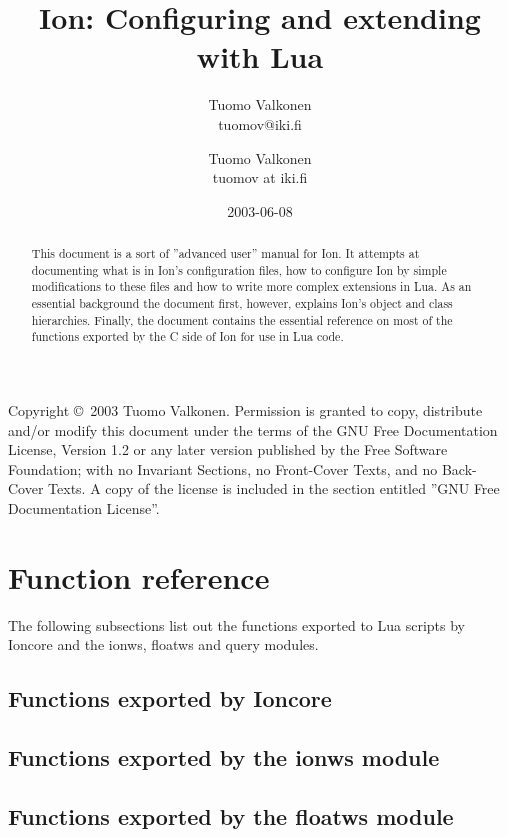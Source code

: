 \documentclass[english,a4paper,11pt,oldtoc,mctitle]{rapport3}
\title{Ion: Configuring and extending with Lua}
\author{Tuomo Valkonen \\ tuomov@iki.fi}
\author{Tuomo Valkonen \\ tuomov at iki.fi}
\date{2003-06-08}
\begin{document}
\maketitle

Copyright \copyright\  2003 Tuomo Valkonen.
Permission is granted to copy, distribute and/or modify this document
under the terms of the GNU Free Documentation License, Version 1.2
or any later version published by the Free Software Foundation;
with no Invariant Sections, no Front-Cover Texts, and no Back-Cover Texts.
A copy of the license is included in the section entitled ''GNU
Free Documentation License''.

\begin{abstract}
    This document is a sort of ''advanced user'' manual for Ion. It
    attempts at documenting what is in Ion's configuration files,
    how to configure Ion by simple modifications to these files and
    how to write more complex extensions in Lua. As an essential 
    background the document first, however, explains Ion's object and
    class hierarchies. Finally, the document contains the essential
    reference on most of the functions exported by the C side of Ion
    for use in Lua code.
\end{abstract}

\tableofcontents





\chapter{Function reference}
\label{sec:exports}

The following subsections list out the functions exported to Lua scripts
by Ioncore and the ionws, floatws and query modules.

\section{Functions exported by Ioncore}
\label{sec:ioncoreref}



\section{Functions exported by the ionws module}
\label{sec:ionwsref}



\section{Functions exported by the floatws module}
\label{sec:floatwsref}
\end{document}
